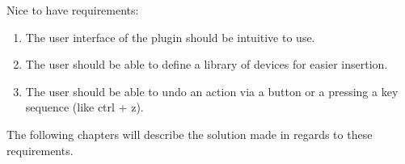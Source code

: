 Nice to have requirements:
\begin{enumerate}
	\item The user interface of the plugin should be intuitive to use.
	\item The user should be able to define a library of devices for easier insertion.
	\item The user should be able to undo an action via a button or a pressing a key sequence (like ctrl + z).
\end{enumerate}

The following chapters will describe the solution made in regards to these requirements.
